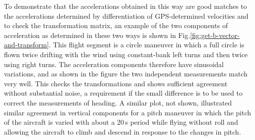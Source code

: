 \documentclass[english,british,amt,bookmarks=false,unicode=true]{copernicus}\usepackage[]{graphicx}\usepackage[]{color}
\begin{document}
To demonstrate that the accelerations obtained in this way are good
matches to the accelerations determined by differentiation of GPS-determined
velocities and to check the transformation matrix, an example of the
two components of acceleration as determined in these two ways is
shown in Fig.\ref{fig:get-b-vector-and-transform}. This flight segment
is a circle maneuver in which a full circle is flown twice drifting
with the wind using constant-bank left turns and then twice using
right turns. The acceleration components therefore have sinusoidal
variations, and as shown in the figure the two independent measurements
match very well. This checks the transformations and shows sufficient
agreement without substantial noise, a requirement if the small difference
is to be used to correct the measurements of heading. A similar plot,
not shown, illustrated similar agreement in vertical components for
a pitch maneuver in which the pitch of the aircraft is varied with
about a 20\,s period while flying without roll and allowing the aircraft
to climb and descend in response to the changes in pitch. 
\end{document}
